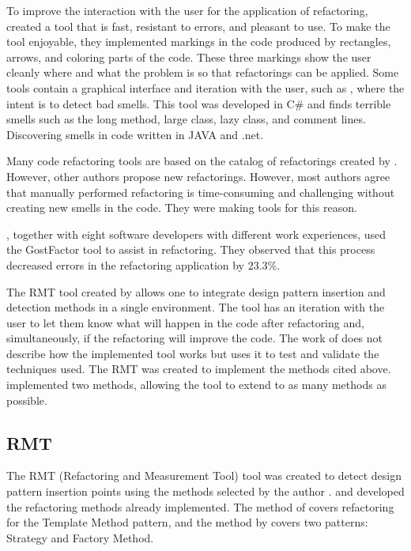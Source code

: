 To improve the interaction with the user for the application of refactoring, \cite{murphy2008breaking} created a tool that is fast, resistant to errors, and pleasant to use. To make the tool enjoyable, they implemented markings in the code produced by rectangles, arrows, and coloring parts of the code. These three markings show the user cleanly where and what the problem is so that refactorings can be applied.
Some tools contain a graphical interface and iteration with the user, such as \textcite{rani2014detection}, where the intent is to detect bad smells. This tool was developed in C\# and finds terrible smells such as the long method, large class, lazy class, and comment lines. Discovering smells in code written in JAVA and .net. 

Many code refactoring tools are based on the catalog of refactorings created by \cite{fowler2018refactoring}. However, other authors propose new refactorings. However, most authors agree that manually performed refactoring is time-consuming and challenging without creating new smells in the code. They were making tools for this reason.

\cite{murphy2008breaking}, together with eight software developers with different work experiences, used the GostFactor tool to assist in refactoring. They observed that this process decreased errors in the refactoring application by 23.3\%.

The RMT tool created by \textcite{beluzzo2018abordagem} allows one to integrate design pattern insertion and detection methods in a single environment. The tool has an iteration with the user to let them know what will happen in the code after refactoring and, simultaneously, if the refactoring will improve the code. The work of \textcite{sangeetha2019empirical} does not describe how the implemented tool works but uses it to test and validate the techniques used. The RMT was created to implement the methods cited above. \textcite{beluzzo2018abordagem} implemented two methods, allowing the tool to extend to as many methods as possible.

\subsection{RMT}
\label{sub-rmt}

The RMT (Refactoring and Measurement Tool) tool was created to detect design pattern insertion points using the methods selected by the author \cite{beluzzo2018abordagem}. \textcite{zafeiris2017automated} and \textcite{liu2014automated} developed the refactoring methods already implemented. The method of \textcite{zafeiris2017automated} covers refactoring for the Template Method pattern, and the method by \textcite{liu2014automated} covers two patterns: Strategy and Factory Method.

